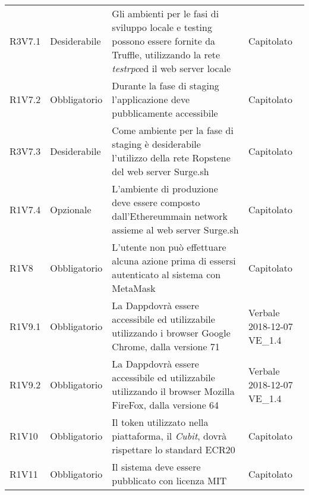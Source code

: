 \begin{center}
\begin{longtable}{ >{\centering}p{} >{\centering}p{}
			>{\raggedright}p{} >{\centering}p{}}
		R3V7.1	&	Desiderabile	&	Gli ambienti per le fasi di sviluppo locale e testing possono essere fornite da Truffle\glo, utilizzando la rete \textit{testrpc}\glosp ed il web server locale	&	Capitolato	\tabularnewline
		R1V7.2	&	Obbligatorio	&	Durante la fase di staging l'applicazione deve pubblicamente accessibile	&	Capitolato	\tabularnewline
		R3V7.3	&	Desiderabile	&	Come ambiente per la fase di staging è desiderabile l'utilizzo della rete Ropsten\glosp e del web server Surge.sh	&	Capitolato	\tabularnewline
		R1V7.4	&	Opzionale	&	L'ambiente di produzione deve essere composto dall'Ethereum\glosp main network assieme al web server Surge.sh	&	Capitolato	\tabularnewline
		R1V8	&	Obbligatorio	&	L'utente non può effettuare alcuna azione prima di essersi autenticato al sistema con MetaMask\glo	&	Capitolato	\tabularnewline
		R1V9.1	&	Obbligatorio	&	La Dapp\glosp dovrà essere accessibile ed utilizzabile utilizzando i browser Google Chrome, dalla versione 71	&	Verbale 2018-12-07  VE\_1.4	\tabularnewline
		R1V9.2	&	Obbligatorio	&	La Dapp\glosp dovrà essere accessibile ed utilizzabile utilizzando il browser Mozilla FireFox, dalla versione 64	&	Verbale 2018-12-07 VE\_1.4	\tabularnewline
		R1V10	&	Obbligatorio	&	Il token utilizzato nella piattaforma, il \textit{Cubit}\glo, dovrà rispettare lo standard ECR20\glo	&	Capitolato	\tabularnewline
		R1V11	&	Obbligatorio	&	Il sistema deve essere pubblicato con licenza MIT	&	Capitolato	\tabularnewline
		
		
		
		
	\end{longtable}
\end{center}
